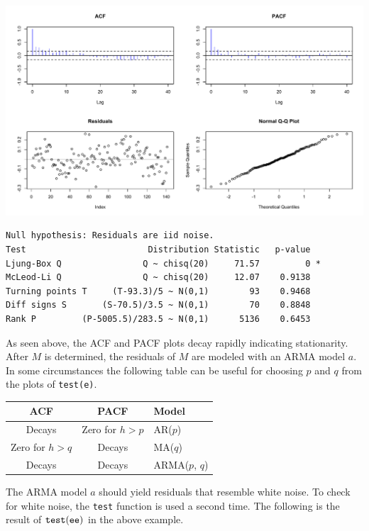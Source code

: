 \documentclass[11pt]{article}
\begin{document}
\begin{center}
\includegraphics[scale=0.3]{Rplot-5.pdf}
\end{center}

\begin{verbatim}
Null hypothesis: Residuals are iid noise.
Test                        Distribution Statistic   p-value
Ljung-Box Q                Q ~ chisq(20)     71.57         0 *
McLeod-Li Q                Q ~ chisq(20)     12.07    0.9138
Turning points T     (T-93.3)/5 ~ N(0,1)        93    0.9468
Diff signs S       (S-70.5)/3.5 ~ N(0,1)        70    0.8848
Rank P         (P-5005.5)/283.5 ~ N(0,1)      5136    0.6453
\end{verbatim}

As seen above, the ACF and PACF plots decay rapidly indicating stationarity.
After $M$ is determined, the residuals of $M$ are
modeled with an ARMA model $a$.
In some circumstances
the following table can be useful for choosing $p$ and $q$ from the
plots of \verb$test(e)$.

\begin{center}
\begin{tabular}{|c|c|l|}
\hline
ACF & PACF & Model\\
\hline
Decays & Zero for $h>p$ & AR($p$)\\
Zero for $h>q$ & Decays & MA($q$)\\
Decays & Decays & ARMA($p$, $q$)\\
\hline
\end{tabular}
\end{center}

The ARMA model $a$ should yield residuals that resemble white noise.
To check for white noise, the {\tt test} function is used a second time.
The following is the result of $\tt test(ee)$ in the above example.
\end{document}
